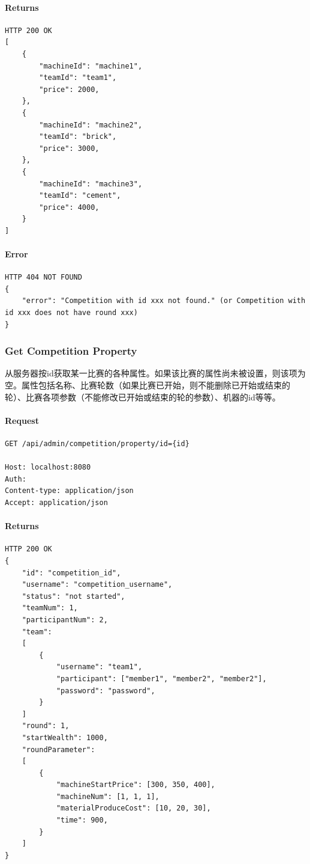 \documentclass{article}
\begin{document}
\paragraph*{Returns}
\begin{lstlisting}
HTTP 200 OK
[
    {
        "machineId": "machine1",
        "teamId": "team1",
        "price": 2000,
    },
    {
        "machineId": "machine2",
        "teamId": "brick",
        "price": 3000,
    },
    {
        "machineId": "machine3",
        "teamId": "cement",
        "price": 4000,
    }
]
\end{lstlisting}

\paragraph*{Error}
\begin{lstlisting}
HTTP 404 NOT FOUND
{
    "error": "Competition with id xxx not found." (or Competition with id xxx does not have round xxx)
}
\end{lstlisting}


\subsubsection{Get Competition Property}

从服务器按id获取某一比赛的各种属性。如果该比赛的属性尚未被设置，则该项为空。属性包括名称、比赛轮数（如果比赛已开始，则不能删除已开始或结束的轮）、比赛各项参数（不能修改已开始或结束的轮的参数）、机器的id等等。

\paragraph*{Request}
\begin{lstlisting}
GET /api/admin/competition/property/id={id}

Host: localhost:8080
Auth:
Content-type: application/json
Accept: application/json
\end{lstlisting}

\paragraph*{Returns}
\begin{lstlisting}
HTTP 200 OK
{
    "id": "competition_id",
    "username": "competition_username",
    "status": "not started",
    "teamNum": 1,
    "participantNum": 2,
    "team":
    [
        {
            "username": "team1",
            "participant": ["member1", "member2", "member2"],
            "password": "password",
        }
    ]
    "round": 1,
    "startWealth": 1000,
    "roundParameter":
    [
        {
            "machineStartPrice": [300, 350, 400],
            "machineNum": [1, 1, 1],
            "materialProduceCost": [10, 20, 30],
            "time": 900,
        }
    ]
}

\end{lstlisting}
\end{document}
